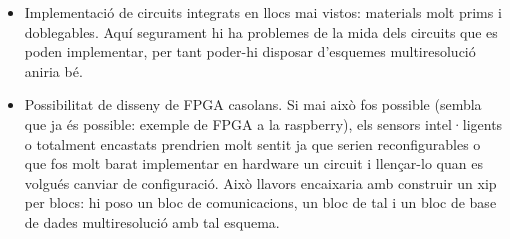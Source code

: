\begin{itemize}
\begin{itemize}
  \item Implementació de circuits integrats en llocs mai vistos:
    materials molt prims i doblegables. Aquí segurament hi ha
    problemes de la mida dels circuits que es poden implementar, per
    tant poder-hi disposar d'esquemes multiresolució aniria bé.

  \item Possibilitat de disseny de FPGA casolans. Si mai això fos
    possible (sembla que ja és possible: exemple de FPGA a la
    raspberry), els sensors intel·ligents o totalment encastats
    prendrien molt sentit ja que serien reconfigurables o que fos molt
    barat implementar en hardware un circuit i llençar-lo quan es
    volgués canviar de configuració. Això llavors encaixaria amb
    construir un xip per blocs: hi poso un bloc de comunicacions, un
    bloc de tal i un bloc de base de dades multiresolució amb tal
    esquema.

  \end{itemize}


\end{itemize}







